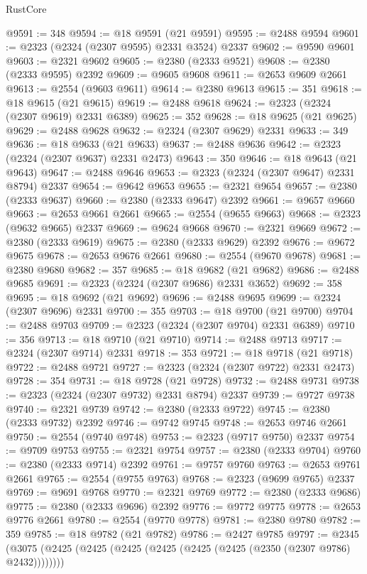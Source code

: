\begin{lexlean}{RustCore}
\begin{coremodule}
@9591 := 348
@9594 := @18 @9591 (@21 @9591)
@9595 := @2488 @9594
@9601 := @2323 (@2324 (@2307 @9595) @2331 @3524) @2337
@9602 := @9590 @9601
@9603 := @2321 @9602
@9605 := @2380 (@2333 @9521)
@9608 := @2380 (@2333 @9595) @2392
@9609 := @9605 @9608
@9611 := @2653 @9609 @2661
@9613 := @2554 (@9603 @9611)
@9614 := @2380 @9613
@9615 := 351
@9618 := @18 @9615 (@21 @9615)
@9619 := @2488 @9618
@9624 := @2323 (@2324 (@2307 @9619) @2331 @6389)
@9625 := 352
@9628 := @18 @9625 (@21 @9625)
@9629 := @2488 @9628
@9632 := @2324 (@2307 @9629) @2331
@9633 := 349
@9636 := @18 @9633 (@21 @9633)
@9637 := @2488 @9636
@9642 := @2323 (@2324 (@2307 @9637) @2331 @2473)
@9643 := 350
@9646 := @18 @9643 (@21 @9643)
@9647 := @2488 @9646
@9653 := @2323 (@2324 (@2307 @9647) @2331 @8794) @2337
@9654 := @9642 @9653
@9655 := @2321 @9654
@9657 := @2380 (@2333 @9637)
@9660 := @2380 (@2333 @9647) @2392
@9661 := @9657 @9660
@9663 := @2653 @9661 @2661
@9665 := @2554 (@9655 @9663)
@9668 := @2323 (@9632 @9665) @2337
@9669 := @9624 @9668
@9670 := @2321 @9669
@9672 := @2380 (@2333 @9619)
@9675 := @2380 (@2333 @9629) @2392
@9676 := @9672 @9675
@9678 := @2653 @9676 @2661
@9680 := @2554 (@9670 @9678)
@9681 := @2380 @9680
@9682 := 357
@9685 := @18 @9682 (@21 @9682)
@9686 := @2488 @9685
@9691 := @2323 (@2324 (@2307 @9686) @2331 @3652)
@9692 := 358
@9695 := @18 @9692 (@21 @9692)
@9696 := @2488 @9695
@9699 := @2324 (@2307 @9696) @2331
@9700 := 355
@9703 := @18 @9700 (@21 @9700)
@9704 := @2488 @9703
@9709 := @2323 (@2324 (@2307 @9704) @2331 @6389)
@9710 := 356
@9713 := @18 @9710 (@21 @9710)
@9714 := @2488 @9713
@9717 := @2324 (@2307 @9714) @2331
@9718 := 353
@9721 := @18 @9718 (@21 @9718)
@9722 := @2488 @9721
@9727 := @2323 (@2324 (@2307 @9722) @2331 @2473)
@9728 := 354
@9731 := @18 @9728 (@21 @9728)
@9732 := @2488 @9731
@9738 := @2323 (@2324 (@2307 @9732) @2331 @8794) @2337
@9739 := @9727 @9738
@9740 := @2321 @9739
@9742 := @2380 (@2333 @9722)
@9745 := @2380 (@2333 @9732) @2392
@9746 := @9742 @9745
@9748 := @2653 @9746 @2661
@9750 := @2554 (@9740 @9748)
@9753 := @2323 (@9717 @9750) @2337
@9754 := @9709 @9753
@9755 := @2321 @9754
@9757 := @2380 (@2333 @9704)
@9760 := @2380 (@2333 @9714) @2392
@9761 := @9757 @9760
@9763 := @2653 @9761 @2661
@9765 := @2554 (@9755 @9763)
@9768 := @2323 (@9699 @9765) @2337
@9769 := @9691 @9768
@9770 := @2321 @9769
@9772 := @2380 (@2333 @9686)
@9775 := @2380 (@2333 @9696) @2392
@9776 := @9772 @9775
@9778 := @2653 @9776 @2661
@9780 := @2554 (@9770 @9778)
@9781 := @2380 @9780
@9782 := 359
@9785 := @18 @9782 (@21 @9782)
@9786 := @2427 @9785
@9797 := @2345 (@3075 (@2425 (@2425 (@2425 (@2425 (@2425 (@2425 (@2350 (@2307 @9786) @2432))))))))

\end{coremodule}
\end{lexlean}
